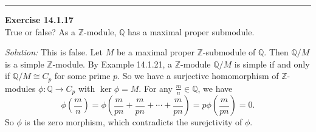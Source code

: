 \documentclass[a4paper, 12pt]{article}
\newenvironment{problem}[2][Exercise]
    { \begin{mdframed}[backgroundcolor=gray!20] \textbf{#1 #2} \\}
    {  \end{mdframed}}
\newenvironment{solution}
    {\textit{Solution:}}
    {}
\begin{document}
\noindent\rule{7in}{2.8pt}
\begin{problem}{14.1.17}
True or false? As a \(\mathbb{Z}\)-module, \(\mathbb{Q}\) has a maximal proper submodule.
\end{problem}
\begin{solution}
This is false. Let \(M\) be a maximal proper \(\mathbb{Z}\)-submodule of \(\mathbb{Q}\). Then \(\mathbb{Q}/M\) is a simple \(\mathbb{Z}\)-module. By Example 14.1.21, a \(\mathbb{Z}\)-module \(\mathbb{Q}/M\) is simple if and only if \(\mathbb{Q}/M\cong C_p\) for some prime \(p\). So we have 
a surjective homomorphism of \(\mathbb{Z}\)-modules \(\phi:\mathbb{Q}\rightarrow C_p\) with \(\ker \phi=M\). For any \(\frac{m}{n}\in \mathbb{Q}\), we have 
\[\phi(\frac{m}{n})=\phi(\frac{m}{pn}+\frac{m}{pn}+\cdots+\frac{m}{pn})=p\phi(\frac{m}{pn})=0.\]
So \(\phi\) is the zero morphism, which contradicts the surejctivity of \(\phi\).
\end{solution}
\end{document}
